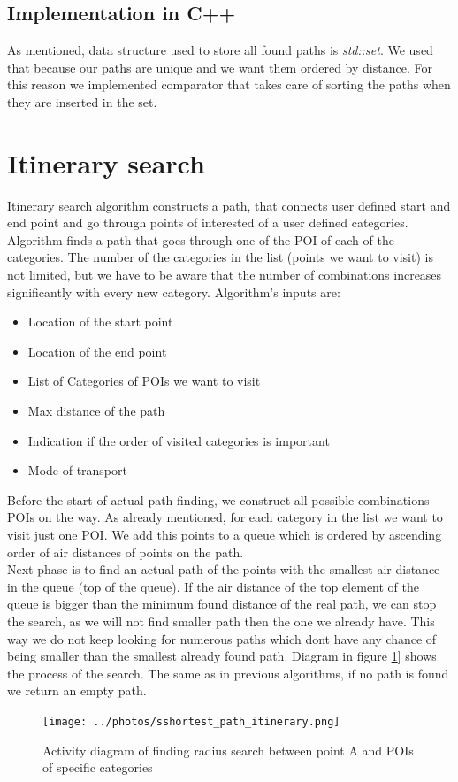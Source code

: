 \documentclass[reqno,openany,12pt]{amsbook}
\theoremstyle{definition}
\theoremstyle{remark}
\begin{document}
 \subsection{Implementation in C++}
 As mentioned, data structure used to store all found paths is \textit{std::set}. We used that because our paths are unique and we want them ordered by distance. For this reason we implemented comparator that takes care of sorting the paths when they are inserted in the set.
\section{Itinerary search}
Itinerary search algorithm constructs a path, that connects user defined start and end point and go through points of interested of a user defined categories. Algorithm finds a path that goes through one of the POI of each of the categories. The number of the categories in the list (points we want to visit) is not limited, but we have to be aware that the number of combinations increases significantly with every new category. Algorithm's inputs are:
\begin{itemize}
\item Location of the start point
\item Location of the end point
\item List of Categories of POIs we want to visit
\item Max distance of the path
\item Indication if the order of visited categories is important
\item Mode of transport
\end{itemize}
Before the start of actual path finding, we construct all possible combinations POIs on the way. As already mentioned, for each category in the list we want to visit just one POI. We add this points to a queue which is ordered by ascending order of air distances of points on the path.\\
Next phase is to find an actual path of the points with the smallest air distance in the queue (top of the queue). If the air distance of the top element of the queue is bigger than the minimum found distance of the real path, we can stop the search, as we will not find smaller path then the one we already have. This way we do not keep looking for numerous paths which dont have any chance of being smaller than the smallest already found path. Diagram in figure \ref{fig:itinerary_activity}] shows the process of the search. The same as in previous algorithms, if no path is found we return an empty path.
 \begin{figure}[h]
 \centering
 \texttt{[image: ../photos/sshortest\_path\_itinerary.png]}
 \caption{Activity diagram of finding radius search between point A and POIs of specific categories}
 \label{fig:itinerary_activity}
 \end{figure}
\end{document}
